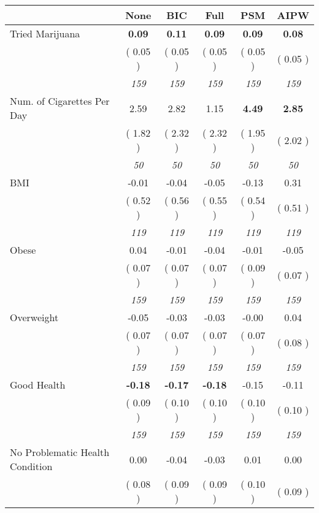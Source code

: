 \begin{tabular}{l c c c c c}
\toprule
 & None & BIC & Full & PSM & AIPW \\
\midrule
Tried Marijuana & \textbf{      0.09 } & \textbf{      0.11 } & \textbf{      0.09 } & \textbf{     0.09} & \textbf{     0.08} \\
& (     0.05 ) & (     0.05 ) & (     0.05 ) & (     0.05 ) & (     0.05 ) \\
& \textit{ 159 } & \textit{ 159 } & \textit{ 159 } & \textit{ 159 } & \textit{ 159 } \\
Num. of Cigarettes Per Day &      2.59 &      2.82 &      1.15 & \textbf{     4.49} & \textbf{     2.85} \\
& (     1.82 ) & (     2.32 ) & (     2.32 ) & (     1.95 ) & (     2.02 ) \\
& \textit{ 50 } & \textit{ 50 } & \textit{ 50 } & \textit{ 50 } & \textit{ 50 } \\
BMI &     -0.01 &     -0.04 &     -0.05 &     -0.13 &      0.31 \\
& (     0.52 ) & (     0.56 ) & (     0.55 ) & (     0.54 ) & (     0.51 ) \\
& \textit{ 119 } & \textit{ 119 } & \textit{ 119 } & \textit{ 119 } & \textit{ 119 } \\
Obese &      0.04 &     -0.01 &     -0.04 &     -0.01 &     -0.05 \\
& (     0.07 ) & (     0.07 ) & (     0.07 ) & (     0.09 ) & (     0.07 ) \\
& \textit{ 159 } & \textit{ 159 } & \textit{ 159 } & \textit{ 159 } & \textit{ 159 } \\
Overweight &     -0.05 &     -0.03 &     -0.03 &     -0.00 &      0.04 \\
& (     0.07 ) & (     0.07 ) & (     0.07 ) & (     0.07 ) & (     0.08 ) \\
& \textit{ 159 } & \textit{ 159 } & \textit{ 159 } & \textit{ 159 } & \textit{ 159 } \\
Good Health & \textbf{     -0.18 } & \textbf{     -0.17 } & \textbf{     -0.18 } &     -0.15 &     -0.11 \\
& (     0.09 ) & (     0.10 ) & (     0.10 ) & (     0.10 ) & (     0.10 ) \\
& \textit{ 159 } & \textit{ 159 } & \textit{ 159 } & \textit{ 159 } & \textit{ 159 } \\
No Problematic Health Condition &      0.00 &     -0.04 &     -0.03 &      0.01 &      0.00 \\
& (     0.08 ) & (     0.09 ) & (     0.09 ) & (     0.10 ) & (     0.09 ) \\

\end{tabular}
